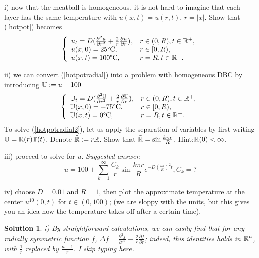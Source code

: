 \documentclass[6pt]{article}
\newtheorem{solution}{Solution}
\numberwithin{equation}{section}
\def\mathbb{\Bbb}
\begin{document}
\begin{enumerate}
i) now that the meatball is homogeneous, it is not hard to imagine that each layer has the same temperature with $u(x,t)=u(r,t)$, $r=|x|$.  Show that (\ref{hotpot}) becomes
\begin{equation}\label{hotpotradial}
\left\{
\begin{array}{ll}
u_t=D(\frac{\partial^2u}{\partial r^2}+\frac{2}{r}\frac{\partial u}{\partial r}),& r\in (0,R),t\in\mathbb R^+,\\
u(x,0)=25 \text{\textdegree{C}},&r\in [0,R),\\
u(x,t)=100 \text{\textdegree{C}}, &r=R, t\in\mathbb R^+.
\end{array}
\right.
\end{equation}

ii) we can convert (\ref{hotpotradial}) into a problem with homogeneous DBC by introducing $\mathbb U:=u-100$
\begin{equation}\label{hotpotradial2}
\left\{
\begin{array}{ll}
\mathbb U_t=D(\frac{\partial^2\mathbb U}{\partial r^2}+\frac{2}{r}\frac{\partial \mathbb U}{\partial r}),& r\in (0,R),t\in\mathbb R^+,\\
\mathbb U(x,0)=-75 \text{\textdegree{C}},&r\in [0,R),\\
\mathbb U(x,t)=0 \text{\textdegree{C}}, &r=R, t\in\mathbb R^+.
\end{array}
\right.
\end{equation}
To solve (\ref{hotpotradial2}), let us apply the separation of variables by first writing $\mathbb U=\mathbb R(r)\mathbb T(t)$.  Denote $\tilde {\mathbb R}:=r\mathbb R$.  Show that $\tilde {\mathbb R}=\sin\frac{k\pi r}{R}$.  Hint:$\mathbb R(0)<\infty$.

iii) proceed to solve for $u$.  \textit{Suggested answer}:
\[u=100+\sum_{k=1}^\infty \frac{C_k}{r}\sin\frac{k\pi r}{R}e^{-D(\frac{k\pi}{R})^2t}, C_k=?\]

iv) choose $D=0.01$ and $R=1$, then plot the approximate temperature at the center $u^{10}(0,t)$ for $t\in(0,100)$; (we are sloppy with the units, but this gives you an idea how the temperature takes off after a certain time).

\begin{solution}

i)  By straightforward calculations, we can easily find that for any radially symmetric function $f$, $\Delta f=\frac{\partial^2 f}{\partial r^2}+\frac{2}{r}\frac{\partial f}{\partial r}$; indeed, this identities holds in $\mathbb R^n$, with $\frac{1}{r}$ replaced by $\frac{n-1}{r}$.  I skip typing here.


\end{solution}
\end{enumerate}
\end{document}
